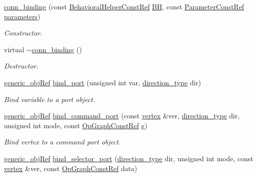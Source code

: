 \begin{DoxyCompactItemize}
\item 
\hyperlink{classconn__binding_aa06a50cd09bec55b1e4d968963abaf55}{conn\+\_\+binding} (const \hyperlink{behavioral__helper_8hpp_aae973b54cac87eef3b27442aa3e1e425}{Behavioral\+Helper\+Const\+Ref} \hyperlink{classconn__binding_a10ef50de9953e2267264484077bdbfdb}{BH}, const \hyperlink{Parameter_8hpp_a37841774a6fcb479b597fdf8955eb4ea}{Parameter\+Const\+Ref} \hyperlink{classconn__binding_a2fea3ae9e3d6941856636531c50c6ff6}{parameters})
\begin{DoxyCompactList}\small\item\em Constructor. \end{DoxyCompactList}\item 
virtual \hyperlink{classconn__binding_ae2443ca6da548b0dbbabbdc9253c4d1e}{$\sim$conn\+\_\+binding} ()
\begin{DoxyCompactList}\small\item\em Destructor. \end{DoxyCompactList}\item 
\hyperlink{generic__obj_8hpp_acb533b2ef8e0fe72e09a04d20904ca81}{generic\+\_\+obj\+Ref} \hyperlink{classconn__binding_a15ab7a8e03857a8a11ce016944f7aaab}{bind\+\_\+port} (unsigned int var, \hyperlink{classconn__binding_af1575e7a7dc7acd00fc5c947f413c663}{direction\+\_\+type} dir)
\begin{DoxyCompactList}\small\item\em Bind variable to a port object. \end{DoxyCompactList}\item 
\hyperlink{generic__obj_8hpp_acb533b2ef8e0fe72e09a04d20904ca81}{generic\+\_\+obj\+Ref} \hyperlink{classconn__binding_ac7b383c69e3484e71b5f4d474af6c2f4}{bind\+\_\+command\+\_\+port} (const \hyperlink{graph_8hpp_abefdcf0544e601805af44eca032cca14}{vertex} \&ver, \hyperlink{classconn__binding_af1575e7a7dc7acd00fc5c947f413c663}{direction\+\_\+type} dir, unsigned int mode, const \hyperlink{op__graph_8hpp_a9a0b240622c47584bee6951a6f5de746}{Op\+Graph\+Const\+Ref} g)
\begin{DoxyCompactList}\small\item\em Bind vertex to a command port object. \end{DoxyCompactList}\item 
\hyperlink{generic__obj_8hpp_acb533b2ef8e0fe72e09a04d20904ca81}{generic\+\_\+obj\+Ref} \hyperlink{classconn__binding_ad6d2c05551ea948d7ce6b4e015292e5e}{bind\+\_\+selector\+\_\+port} (\hyperlink{classconn__binding_af1575e7a7dc7acd00fc5c947f413c663}{direction\+\_\+type} dir, unsigned int mode, const \hyperlink{graph_8hpp_abefdcf0544e601805af44eca032cca14}{vertex} \&ver, const \hyperlink{op__graph_8hpp_a9a0b240622c47584bee6951a6f5de746}{Op\+Graph\+Const\+Ref} data)

\end{DoxyCompactItemize}
